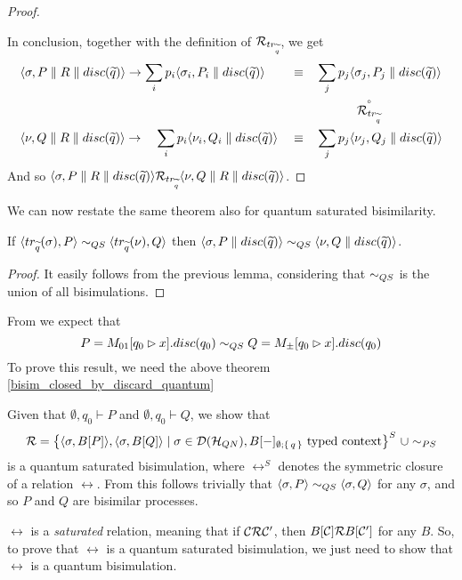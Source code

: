\begin{proof}
\begin{itemize}
\end{itemize}
In conclusion, together with the definition of $\mathcal{R}_{tr_{\widetilde{q}}}$, we get
\begin{align*}
& \langle\sigma, P\parallel R \parallel disc(\widetilde{q})\rangle \rightarrow \sum_i p_i \langle\sigma_i, P_i \parallel disc(\widetilde{q})\rangle & & \equiv  &  & \sum_j p_j \langle\sigma_j, P_j \parallel disc(\widetilde{q})\rangle 
\\
 & & & & & \qquad\quad\stackrel{\scriptscriptstyle \circ}{\mathcal{R}_{tr_{\widetilde{q}}}} 
\\
& \langle\nu, Q\parallel R\parallel disc(\widetilde{q})\rangle \rightarrow \quad\sum_i p_i \langle\nu_i, Q_i\parallel disc(\widetilde{q})\rangle & & \equiv & &  \sum_j p_j \langle\nu_j, Q_j\parallel disc(\widetilde{q})\rangle
\end{align*}
And so $\langle\sigma, P\parallel R \parallel disc(\widetilde{q})\rangle \mathcal{R}_{tr_{\widetilde{q}}}\langle\nu, Q\parallel R\parallel disc(\widetilde{q})\rangle$.
\end{proof}

We can now restate the same theorem also for quantum saturated bisimilarity.

\begin{theorem}\label{bisim_closed_by_discard_quantum}
If $\langle tr_{\widetilde{q}}(\sigma), P\rangle \sim_{QS} \langle tr_{\widetilde{q}}(\nu), Q\rangle$ then $\langle\sigma, P \parallel disc(\widetilde{q})\rangle \sim_{QS} \langle\nu, Q \parallel disc(\widetilde{q})\rangle$.
\end{theorem}
\begin{proof}
It easily follows from the previous lemma, considering that $\sim_{QS}$ is the union of all bisimulations.
\end{proof}

From \cite{davidsonFormalVerificationTechniques2012} we expect that $$P =  M_{01}[q_0 \rhd x].disc(q_0) \sim_{QS} Q = M_\pm[q_0 \rhd x].disc(q_0)$$To prove this result, we need the above theorem \ref{bisim_closed_by_discard_quantum}

Given that $\emptyset, {q_0} \vdash P$ and $\emptyset, {q_0} \vdash Q$, we show that
\[\mathcal{R} = \big\{ \langle\sigma, B[P]\rangle, \langle\sigma, B[Q]\rangle \mid \sigma \in \mathcal{D}(\mathcal{H}_{QN}), B[{-}]_{\emptyset; \set{q}} \text{ typed context}\big\}^S\ \cup \sim_{PS}
\]
is a quantum saturated bisimulation, where $\rel^S$ denotes the symmetric closure of a relation $\rel$. From this follows trivially that $\langle\sigma, P\rangle \sim_{QS} \langle\sigma, Q\rangle$ for any $\sigma$, and so $P$ and $Q$ are bisimilar processes.

$\rel$ is a \textit{saturated} relation, meaning that if $\mathcal{C} \mathcal{R} \mathcal{C}'$, then $B[\mathcal{C}] \mathcal{R} B[\mathcal{C}']$ for any $B$. So, to prove that $\rel$ is a quantum saturated bisimulation, we just need to show that $\rel$ is a quantum bisimulation.


